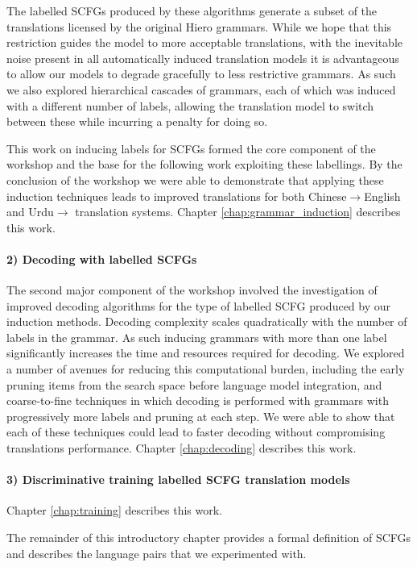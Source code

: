 The labelled SCFGs produced by these algorithms generate a subset of the translations licensed by the original Hiero grammars.
While we hope that this restriction guides the model to more acceptable translations, with the inevitable noise present in all automatically induced translation models it is advantageous to allow our models to degrade gracefully to less restrictive grammars.
As such we also explored hierarchical cascades of grammars, each of which was induced with a different number of labels, allowing the translation model to switch between these while incurring a penalty for doing so.

This work on inducing labels for SCFGs formed the core component of the workshop and the base for the following work exploiting these labellings. 
By the conclusion of the workshop we were able to demonstrate that applying these induction techniques leads to improved translations for both Chinese$\rightarrow$English and Urdu$\rightarrow$ translation systems.
Chapter \ref{chap:grammar_induction} describes this work.

\paragraph{2) Decoding with labelled SCFGs}
The second major component of the workshop involved the investigation of improved decoding algorithms for the type of labelled SCFG produced by our induction methods.
Decoding complexity scales quadratically with the number of labels in the grammar.
As such inducing grammars with more than one label significantly increases the time and resources required for decoding.
We explored a number of avenues for reducing this computational burden, including the early pruning items from the search space before language model integration, and coarse-to-fine techniques in which decoding is performed with grammars with progressively more labels and pruning at each step.
We were able to show that each of these techniques could lead to faster decoding without compromising translations performance.
Chapter \ref{chap:decoding} describes this work.

\paragraph{3) Discriminative training labelled SCFG translation models}
Chapter \ref{chap:training} describes this work.

The remainder of this introductory chapter provides a formal definition of SCFGs and describes the language pairs that we experimented with.

